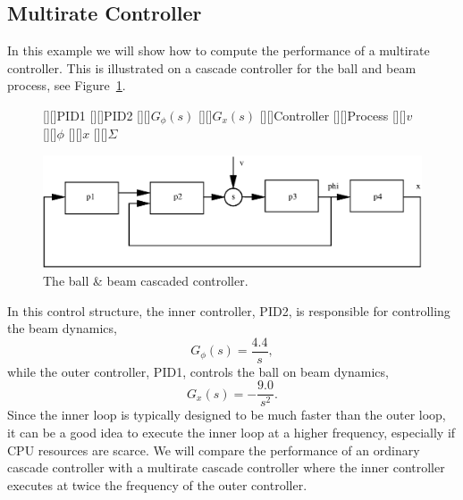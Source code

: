 \documentclass[final,twoside]{rapport}  %
\begin{document}
\subsection{Multirate Controller}
In this example we will show how to compute the performance of a
multirate controller. This is illustrated on a cascade controller for
the ball and beam process, see Figure~\ref{fig:cascade}.
\begin{figure}[tbp]
[][]{PID1}
[][]{PID2}
[][]{$G_\phi(s)$}
[][]{$G_x(s)$}
[][]{\small Controller}
[][]{\small Process}
[][]{$v$}
[][]{$\phi$}
[][]{$x$}
[][]{\small $\Sigma$}
\centerline{
\includegraphics[scale=0.6]{cascade.eps}}
  \caption{The ball \& beam cascaded controller.}
  \label{fig:cascade}
\end{figure}
In this control structure, the inner controller, PID2, is
responsible for controlling the beam 
dynamics,
\[
G_\phi(s) = \frac{4.4}{s},
\]
while the outer controller, PID1, controls the ball on beam dynamics,
\[
G_x(s) = -\frac{9.0}{s^2}.
\]
Since the inner loop is typically designed to be much faster than the
outer loop, it can be a good idea to execute the inner loop at a
higher frequency, especially if CPU resources are scarce. We will
compare the performance of an ordinary cascade controller with a
multirate cascade controller where the inner controller executes at
twice the frequency of the outer controller.
\end{document}
